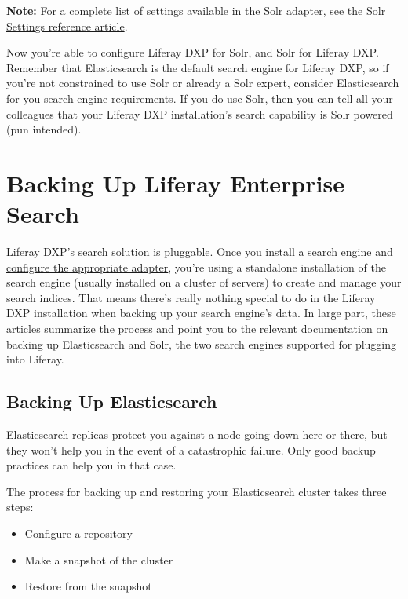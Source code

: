 \noindent\hrulefill

\textbf{Note:} For a complete list of settings available in the Solr
adapter, see the
\href{/docs/7-0/deploy/-/knowledge_base/d/solr-settings}{Solr Settings
reference article}.

\noindent\hrulefill

Now you're able to configure Liferay DXP for Solr, and Solr for
Liferay DXP. Remember that Elasticsearch is the default search engine for
Liferay DXP, so if you're not constrained to use Solr or already a Solr
expert, consider Elasticsearch for you search engine requirements. If
you do use Solr, then you can tell all your colleagues that your Liferay
DXP installation's search capability is Solr powered (pun intended).

\chapter{Backing Up Liferay Enterprise
Search}\label{backing-up-liferay-enterprise-search}

Liferay DXP's search solution is pluggable. Once you
\href{/docs/7-0/deploy/-/knowledge_base/d/installing-a-search-engine}{install
a search engine and configure the appropriate adapter}, you're using a
standalone installation of the search engine (usually installed on a
cluster of servers) to create and manage your search indices. That means
there's really nothing special to do in the Liferay DXP installation
when backing up your search engine's data. In large part, these articles
summarize the process and point you to the relevant documentation on
backing up Elasticsearch and Solr, the two search engines supported for
plugging into Liferay.

\section{Backing Up Elasticsearch}\label{backing-up-elasticsearch}

\href{https://www.elastic.co/guide/en/elasticsearch/guide/current/replica-shards.html}{Elasticsearch
replicas} protect you against a node going down here or there, but they
won't help you in the event of a catastrophic failure. Only good backup
practices can help you in that case.

The process for backing up and restoring your Elasticsearch cluster
takes three steps:

\begin{itemize}
\tightlist
\item
  Configure a repository
\item
  Make a snapshot of the cluster
\item
  Restore from the snapshot
\end{itemize}


